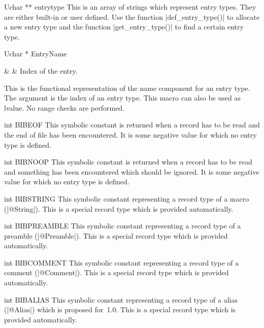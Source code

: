 \begin{Variable}{Uchar ** }{entrytype}
  This is an array of strings which represent entry
  types. They are either built-in or user defined. Use
  the function |def_entry_type()| to allocate a new
  entry type and the function |get_entry_type()| to find
  a certain entry type.
\end{Variable}
\begin{Macro}{Uchar * }{EntryName}
  \begin{Arguments}
    &  & Index of the entry.\\
  \end{Arguments}%
  This is the functional representation of the name
  component for an entry type. The argument is the index
  of an entry type. This macro can also be used as
  lvalue. No range checks are performed. 
\end{Macro}
\begin{Constant}{int }{BIBEOF}
  This symbolic constant is returned when a record has
  to be read and the end of file has been
  encountered. It is some negative value for which no
  entry type is defined.
\end{Constant}
\begin{Constant}{int }{BIBNOOP}
  This symbolic constant is returned when a record has
  to be read and something has been encountered which
  should be ignored. It is some negative value for which no
  entry type is defined.
\end{Constant}
\begin{Constant}{int }{BIBSTRING}
  This symbolic constant representing a record type of a
  \BibTeX{} macro (|@String|). This is a special record
  type which is provided automatically.
\end{Constant}
\begin{Constant}{int }{BIBPREAMBLE}
  This symbolic constant representing a record type of a
  \BibTeX{} preamble (|@Preamble|). This is a special record
  type which is provided automatically.
\end{Constant}
\begin{Constant}{int }{BIBCOMMENT}
  This symbolic constant representing a record type of a
  \BibTeX{} comment (|@Comment|). This is a special record
  type which is provided automatically.
\end{Constant}
\begin{Constant}{int }{BIBALIAS}
  This symbolic constant representing a record type of a
  \BibTeX{} alias (|@Alias|) which is proposed for
  \BibTeX\,1.0. This is a special record type which is
  provided automatically.
\end{Constant}
